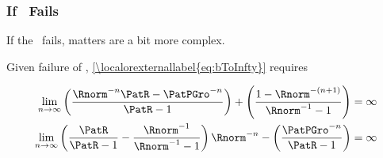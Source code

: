 \documentclass[\econtexRoot/BufferStockTheory]{subfiles}
\begin{document}

\subsubsection{If \FHWC~Fails}
If the \FHWC~fails, matters are a bit more complex.

\begin{comment}
  As noted in the main text, the Finite Value Requirement for such a consumer
  requires $\PatPGro < (\Rfree/\PGro)^{1/\CRRA}$,\footnote{A
    unique well-defined nondegenerate limiting consumption function can
    actually exist even if a nondegenerate value function does not.  But
    the parametric combinations required for this are somewhat peculiar
    (including both $\Rfree < 1$ and $\PGro < 1$); but we restrict our attention
    to the more useful and plausible cases with finite value.} which is stronger (holds
  in strictly fewer circumstances) than the \PFGIC~condition $\PatPGro < 1$.
  Thus, the \PFGIC~is an implication of $\cncl{\FHWC}$.
\end{comment}

Given failure of \FHWC, \eqref{\localorexternallabel{eq:bToInfty}} requires

\begin{equation}\begin{gathered}\begin{aligned}
  \lim_{n \rightarrow \infty} \left(\frac{\Rnorm^{-n}\PatR-\PatPGro^{-n}}{\PatR-1}\right) + \left(\frac{1-\Rnorm^{-(n+1)}}{\Rnorm^{-1}-1}\right)  & = \infty  
  \\   \lim_{n \rightarrow \infty} \left(\frac{\PatR}{\PatR-1}-\frac{\Rnorm^{-1}}{\Rnorm^{-1}-1}\right)\Rnorm^{-n}-\left(\frac{\PatPGro^{-n}}{\PatR-1}\right)  & = \infty \label{eq:FHWCfails} 
\end{aligned}\end{gathered}\end{equation}
\hypertarget{PFGICHoldsFHWCFailsRICFailsDiscuss}{}
\end{document}

